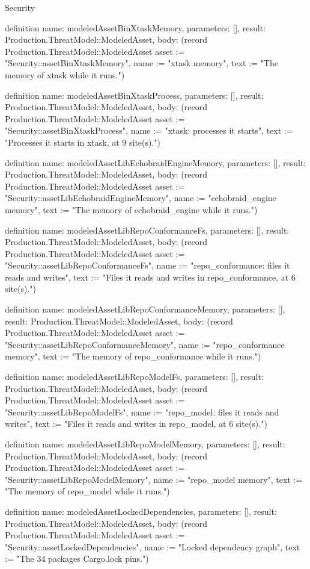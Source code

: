 \begin{lexlean}{Security}
\begin{semanticmodule}
definition{
  name: modeledAssetBinXtaskMemory,
  parameters: [],
  result: Production.ThreatModel::ModeledAsset,
  body: (record Production.ThreatModel::ModeledAsset {asset := "Security::assetBinXtaskMemory", name := "xtask memory", text := "The memory of xtask while it runs."})
}

definition{
  name: modeledAssetBinXtaskProcess,
  parameters: [],
  result: Production.ThreatModel::ModeledAsset,
  body: (record Production.ThreatModel::ModeledAsset {asset := "Security::assetBinXtaskProcess", name := "xtask: processes it starts", text := "Processes it starts in xtask, at 9 site(s)."})
}

definition{
  name: modeledAssetLibEchobraidEngineMemory,
  parameters: [],
  result: Production.ThreatModel::ModeledAsset,
  body: (record Production.ThreatModel::ModeledAsset {asset := "Security::assetLibEchobraidEngineMemory", name := "echobraid_engine memory", text := "The memory of echobraid_engine while it runs."})
}

definition{
  name: modeledAssetLibRepoConformanceFs,
  parameters: [],
  result: Production.ThreatModel::ModeledAsset,
  body: (record Production.ThreatModel::ModeledAsset {asset := "Security::assetLibRepoConformanceFs", name := "repo_conformance: files it reads and writes", text := "Files it reads and writes in repo_conformance, at 6 site(s)."})
}

definition{
  name: modeledAssetLibRepoConformanceMemory,
  parameters: [],
  result: Production.ThreatModel::ModeledAsset,
  body: (record Production.ThreatModel::ModeledAsset {asset := "Security::assetLibRepoConformanceMemory", name := "repo_conformance memory", text := "The memory of repo_conformance while it runs."})
}

definition{
  name: modeledAssetLibRepoModelFs,
  parameters: [],
  result: Production.ThreatModel::ModeledAsset,
  body: (record Production.ThreatModel::ModeledAsset {asset := "Security::assetLibRepoModelFs", name := "repo_model: files it reads and writes", text := "Files it reads and writes in repo_model, at 6 site(s)."})
}

definition{
  name: modeledAssetLibRepoModelMemory,
  parameters: [],
  result: Production.ThreatModel::ModeledAsset,
  body: (record Production.ThreatModel::ModeledAsset {asset := "Security::assetLibRepoModelMemory", name := "repo_model memory", text := "The memory of repo_model while it runs."})
}

definition{
  name: modeledAssetLockedDependencies,
  parameters: [],
  result: Production.ThreatModel::ModeledAsset,
  body: (record Production.ThreatModel::ModeledAsset {asset := "Security::assetLockedDependencies", name := "Locked dependency graph", text := "The 34 packages Cargo.lock pins."})
}


\end{semanticmodule}
\end{lexlean}
